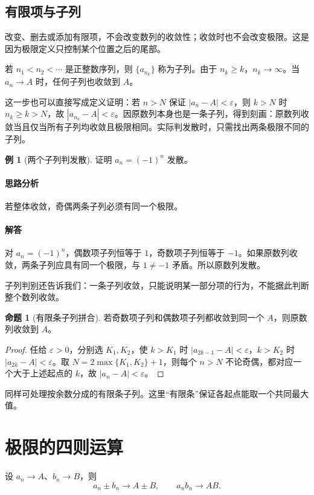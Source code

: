 \documentclass[UTF8,fontset=fandol,12pt,oneside,openany]{ctexrep}
\theoremstyle{definition}
\newtheorem{proposition}[theorem]{命题}
\newtheorem{example}{例}[chapter]
\begin{document}
\subsection*{有限项与子列}

改变、删去或添加有限项，不会改变数列的收敛性；收敛时也不会改变极限。这是因为极限定义只控制某个位置之后的尾部。

若 $n_1<n_2<\cdots$ 是正整数序列，则 $\{a_{n_k}\}$ 称为子列。由于 $n_k\ge k$，$n_k\to\infty$。当 $a_n\to A$ 时，任何子列也收敛到 $A$。

这一步也可以直接写成定义证明：若 $n>N$ 保证 $|a_n-A|<\varepsilon$，则 $k>N$ 时 $n_k\ge k>N$，故 $|a_{n_k}-A|<\varepsilon$。因原数列本身也是一条子列，得到刻画：原数列收敛当且仅当所有子列均收敛且极限相同。实际判发散时，只需找出两条极限不同的子列。

\begin{example}[两个子列判发散]
证明 $a_n=(-1)^n$ 发散。
\end{example}
\paragraph{思路分析} 若整体收敛，奇偶两条子列必须有同一个极限。
\paragraph{解答} 对 $a_n=(-1)^n$，偶数项子列恒等于 $1$，奇数项子列恒等于 $-1$。如果原数列收敛，两条子列应具有同一个极限，与 $1\ne-1$ 矛盾。所以原数列发散。

子列判别还告诉我们：一条子列收敛，只能说明某一部分项的行为，不能据此判断整个数列收敛。

\begin{proposition}[有限条子列拼合]
若奇数项子列和偶数项子列都收敛到同一个 $A$，则原数列收敛到 $A$。
\end{proposition}
\begin{proof}
任给 $\varepsilon>0$，分别选 $K_1,K_2$，使 $k>K_1$ 时 $|a_{2k-1}-A|<\varepsilon$，$k>K_2$ 时 $|a_{2k}-A|<\varepsilon$。取 $N=2\max\{K_1,K_2\}+1$，则每个 $n>N$ 不论奇偶，都对应一个大于上述起点的 $k$，故 $|a_n-A|<\varepsilon$。
\end{proof}
同样可处理按余数分成的有限条子列。这里“有限条”保证各起点能取一个共同最大值。

\section{极限的四则运算}

设 $a_n\to A$、$b_n\to B$，则
\[
a_n\pm b_n\to A\pm B,\qquad a_nb_n\to AB.
\]
\end{document}
